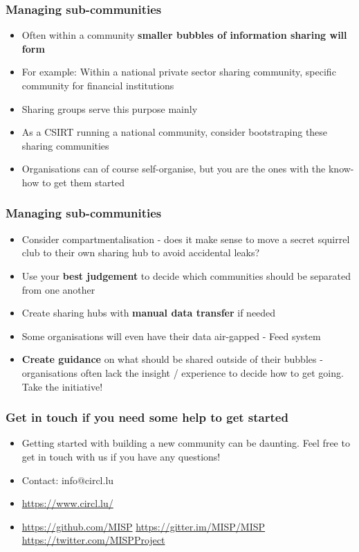 \begin{frame}
\frametitle{Managing sub-communities}
\begin{itemize}
    \item Often within a community {\bf smaller bubbles of information sharing will form}
	\item For example: Within a national private sector sharing community, specific community for financial institutions
	\item Sharing groups serve this purpose mainly
	\item As a CSIRT running a national community, consider bootstraping these sharing communities
	\item Organisations can of course self-organise, but you are the ones with the know-how to get them started
\end{itemize}
\end{frame}

\begin{frame}
\frametitle{Managing sub-communities}
\begin{itemize}
	\item Consider compartmentalisation - does it make sense to move a secret squirrel club to their own sharing hub to avoid accidental leaks?
    \item Use your {\bf best judgement} to decide which communities should be separated from one another
    \item Create sharing hubs with {\bf manual data transfer} if needed
	\item Some organisations will even have their data air-gapped - Feed system
    \item {\bf Create guidance} on what should be shared outside of their bubbles - organisations often lack the insight / experience to decide how to get going. Take the initiative!
\end{itemize}
\end{frame}

\begin{frame}
\frametitle{Get in touch if you need some help to get started}
\begin{itemize}
\item Getting started with building a new community can be daunting. Feel free to get in touch with us if you have any questions!
\item Contact: info@circl.lu
\item \url{https://www.circl.lu/}
\item \url{https://github.com/MISP}  \url{https://gitter.im/MISP/MISP}  \url{https://twitter.com/MISPProject}
\end{itemize}
\end{frame}

